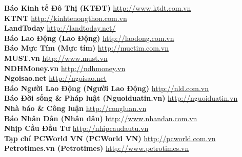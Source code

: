 \textbf{Báo Kinh tế Đô Thị (KTĐT)}  \hspace{0.5in} \href{http://www.ktdt.com.vn}{http://www.ktdt.com.vn} \\ 
\textbf{KTNT}  \hspace{0.5in} \href{http://kinhtenongthon.com.vn}{http://kinhtenongthon.com.vn} \\ 
\textbf{LandToday}  \hspace{0.5in} \href{http://landtoday.net/}{http://landtoday.net/} \\ 
\textbf{Báo Lao Động (Lao Động)}  \hspace{0.5in} \href{http://laodong.com.vn}{http://laodong.com.vn} \\ 
\textbf{Báo Mực Tím (Mực tím)}  \hspace{0.5in} \href{http://muctim.com.vn}{http://muctim.com.vn} \\ 
\textbf{MUST.vn}  \hspace{0.5in} \href{http://www.must.vn}{http://www.must.vn} \\ 
\textbf{NDHMoney.vn}  \hspace{0.5in} \href{http://ndhmoney.vn}{http://ndhmoney.vn} \\ 
\textbf{Ngoisao.net}  \hspace{0.5in} \href{http://ngoisao.net}{http://ngoisao.net} \\ 
\textbf{Báo Người Lao Động (Người Lao Động)}  \hspace{0.5in} \href{http://nld.com.vn}{http://nld.com.vn} \\ 
\textbf{Báo Đời sống & Pháp luật (Nguoiduatin.vn)}  \hspace{0.5in} \href{http://nguoiduatin.vn}{http://nguoiduatin.vn} \\ 
\textbf{Nhà báo & Công luận}  \hspace{0.5in} \href{http://congluan.vn}{http://congluan.vn} \\ 
\textbf{Báo Nhân Dân (Nhân dân)}  \hspace{0.5in} \href{http://www.nhandan.com.vn}{http://www.nhandan.com.vn} \\ 
\textbf{Nhịp Cầu Đầu Tư}  \hspace{0.5in} \href{http://nhipcaudautu.vn}{http://nhipcaudautu.vn} \\ 
\textbf{Tạp chí PCWorld VN (PCWorld VN)}  \hspace{0.5in} \href{http://pcworld.com.vn}{http://pcworld.com.vn} \\ 
\textbf{Petrotimes.vn (Petrotimes)}  \hspace{0.5in} \href{http://www.petrotimes.vn}{http://www.petrotimes.vn} \\ 
